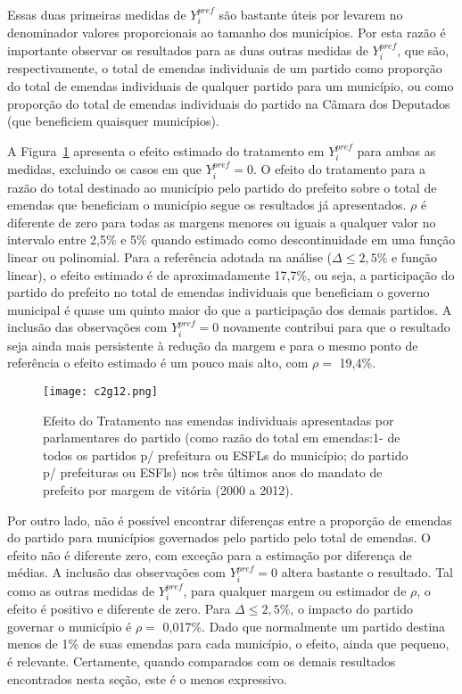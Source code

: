 Essas duas primeiras medidas de $Y_{i}^{pref}$ são bastante úteis por levarem no denominador valores proporcionais ao tamanho dos municípios. Por esta razão é importante observar os resultados para as duas outras medidas de $Y_{i}^{pref}$, que são, respectivamente, o total de emendas individuais de um partido como proporção do total de emendas individuais de qualquer partido para um município, ou como proporção do total de emendas individuais do partido na Câmara dos Deputados (que beneficiem quaisquer municípios).

A Figura~\ref{fig:c2g12} apresenta o efeito estimado do tratamento em $Y_{i}^{pref}$ para ambas as medidas, excluindo os casos em que $Y_{i}^{pref}=0$. O efeito do tratamento para a razão do total destinado ao município pelo partido do prefeito sobre o total de emendas que beneficiam o município segue os resultados já apresentados. $\rho$ é diferente de zero para todas as margens menores ou iguais a qualquer valor no intervalo entre 2,5\% e 5\% quando estimado como descontinuidade em uma função linear ou polinomial. Para a referência adotada na análise ($\Delta \leq 2,5\%$ e função linear), o efeito estimado é de aproximadamente 17,7\%, ou seja, a participação do partido do prefeito no total de emendas individuais que beneficiam o governo municipal é quase um quinto maior do que a participação dos demais partidos. A inclusão das observações com $Y_{i}^{pref}=0$ novamente contribui para que o resultado seja ainda mais persistente à redução da margem e para o mesmo ponto de referência o efeito estimado é um pouco mais alto, com $\rho=$ 19,4\%.

\begin{figure}[htp]
	\centering
	\texttt{[image: c2g12.png]}
	\caption{Efeito do Tratamento nas emendas individuais apresentadas por parlamentares do partido (como razão do total em emendas:1- de todos os partidos p/ prefeitura ou ESFLs do município; do partido p/ prefeituras ou ESFls) nos três últimos anos do mandato de prefeito por margem de vitória (2000 a 2012).}
	\label{fig:c2g12}
\end{figure}

Por outro lado, não é possível encontrar diferenças entre a proporção de emendas do partido para municípios governados pelo partido pelo total de emendas. O efeito não é diferente zero, com exceção para a estimação por diferença de médias. A inclusão das observações com $Y_{i}^{pref}=0$ altera bastante o resultado. Tal como as outras medidas de $Y_{i}^{pref}$, para qualquer margem ou estimador de $\rho$, o efeito é positivo e diferente de zero. Para $\Delta \leq 2,5\%$, o impacto do partido governar o município é $\rho=$ 0,017\%. Dado que normalmente um partido destina menos de 1\% de suas emendas para cada município, o efeito, ainda que pequeno, é relevante. Certamente, quando comparados com os demais resultados encontrados nesta seção, este é o menos expressivo.

